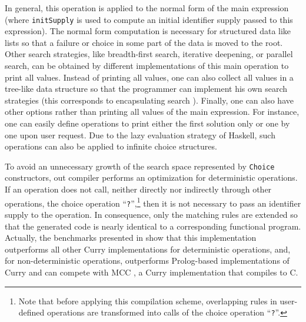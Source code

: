 \documentclass{llncs}
\newcommand{\code}[1]{\mbox{\small\texttt{#1}}}
\newcommand{\ccode}[1]{``\code{#1}''}
\begin{document}
In general, this operation is applied to the normal form
of the main expression (where \code{initSupply} is used to
compute an initial identifier supply passed to this expression).
The normal form computation is necessary for structured data like lists
so that a failure or choice in some part of the data is moved to
the root. Other search strategies, like
breadth-first search, iterative deepening, or parallel search,
can be obtained by different implementations of this main operation
to print all values. Instead of printing all values,
one can also collect all values in a tree-like data structure
so that the programmer can implement his own search strategies
(this corresponds to encapsulating search \cite{BrasselHanusHuch04JFLP}).
Finally, one can also have other options rather than printing all values
of the main expression.
For instance, one can easily define operations
to print either the first solution only or one by one upon user request.
Due to the lazy evaluation strategy of Haskell,
such operations can also be applied to infinite choice structures.

To avoid an unnecessary growth of the search space represented by
\code{Choice} constructors, out compiler performs an optimization for
deterministic operations. If an operation does not call, 
neither directly nor indirectly through
other operations, the choice operation \ccode{?},\footnote{%
Note that before applying this compilation scheme, overlapping rules in
user-defined operations are transformed into calls of the choice operation
\ccode{?}.}
then it is not necessary to pass an identifier supply to the operation.
In consequence, only the matching rules are extended so that the generated code
is nearly identical to a corresponding functional program.
Actually, the benchmarks presented in \cite{BrasselFischerHanusReck11}
show that this implementation outperforms all other Curry implementations
for deterministic operations,
and, for non-deterministic operations, outperforms Prolog-based
implementations of Curry and can compete with MCC \cite{Lux99FLOPS},
a Curry implementation that compiles to C.
\end{document}
